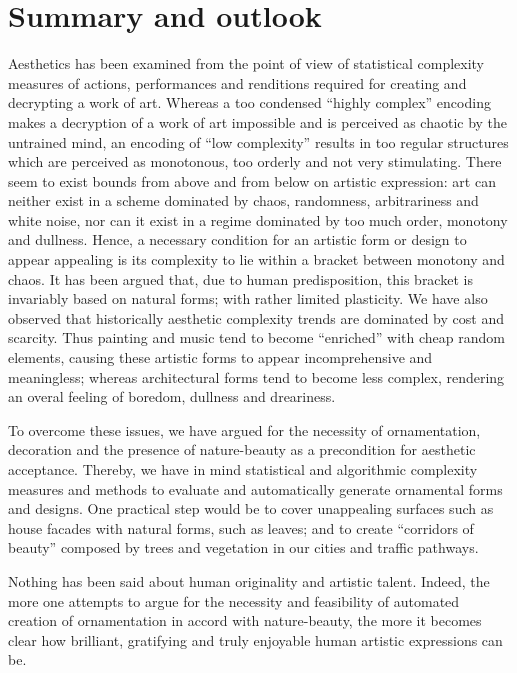 \documentclass[%
 reprint,
 showpacs,
 showkeys,
 amsmath,
 amssymb,
 aps,
 pra,
 longbibliography,
 floatfix,
 ]{revtex4-1}
\begin{document}
\section{Summary and outlook}

Aesthetics has been examined from the point of view of statistical complexity measures of actions, performances and renditions required for creating and decrypting a work of art.
Whereas a too condensed ``highly complex'' encoding makes a decryption of a work of art impossible and is perceived as chaotic by the untrained mind,
an encoding of ``low complexity'' results in too regular structures which are perceived as monotonous, too orderly and not very stimulating.
There seem to exist bounds from above and from below on artistic expression:
art can neither exist in a scheme dominated by chaos, randomness, arbitrariness and white noise, nor can it exist in a regime dominated by too much order, monotony and dullness.
Hence, a necessary condition for an artistic form or design to appear appealing is its complexity to lie within a bracket between monotony and chaos.
It has been argued that, due to human predisposition, this bracket is invariably based on natural forms; with rather limited plasticity.
We have also observed that historically aesthetic complexity trends are dominated by cost and scarcity.
Thus painting and music tend to become ``enriched'' with cheap random elements, causing these artistic forms to appear incomprehensive and meaningless;
whereas architectural forms tend to become less complex, rendering an overal feeling of boredom, dullness and dreariness.

To overcome these issues, we have argued for the necessity of ornamentation,
decoration and the presence of nature-beauty as a precondition for aesthetic acceptance.
Thereby, we have in mind statistical and algorithmic complexity measures and methods to
evaluate and automatically generate ornamental forms and designs.
One practical step would be to cover unappealing surfaces such as house facades with natural forms, such as leaves;
and to create ``corridors of beauty'' composed by trees and vegetation in our cities and traffic pathways.

Nothing has been said about human originality and artistic talent.
Indeed, the more one attempts to argue for the necessity and feasibility of
automated creation of ornamentation in accord with nature-beauty, the more
it becomes clear how brilliant, gratifying and truly enjoyable human
artistic expressions can be.
\end{document}
